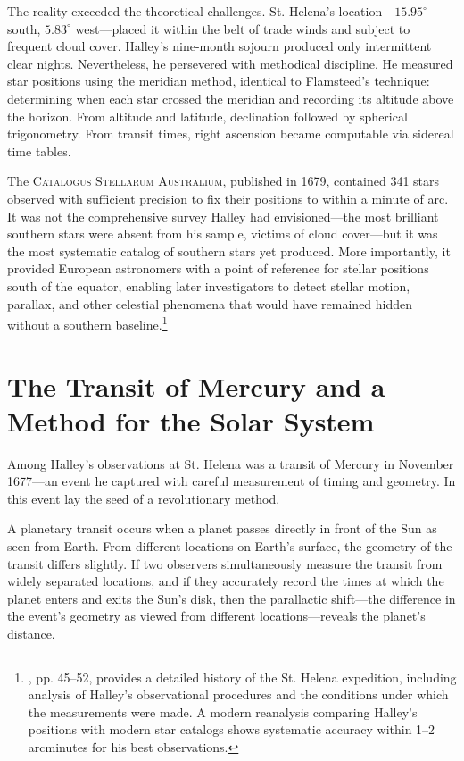 The reality exceeded the theoretical challenges. St. Helena's location—$15.95^{\circ}$ south, $5.83^{\circ}$ west—placed it within the belt of trade winds and subject to frequent cloud cover. Halley's nine-month sojourn produced only intermittent clear nights. Nevertheless, he persevered with methodical discipline. He measured star positions using the meridian method, identical to Flamsteed's technique: determining when each star crossed the meridian and recording its altitude above the horizon. From altitude and latitude, declination followed by spherical trigonometry. From transit times, right ascension became computable via sidereal time tables.

The \textsc{Catalogus Stellarum Australium}, published in 1679, contained 341 stars observed with sufficient precision to fix their positions to within a minute of arc. It was not the comprehensive survey Halley had envisioned—the most brilliant southern stars were absent from his sample, victims of cloud cover—but it was the most systematic catalog of southern stars yet produced. More importantly, it provided European astronomers with a point of reference for stellar positions south of the equator, enabling later investigators to detect stellar motion, parallax, and other celestial phenomena that would have remained hidden without a southern baseline.\footnote{\textcite{Cook1998}, pp. 45--52, provides a detailed history of the St. Helena expedition, including analysis of Halley's observational procedures and the conditions under which the measurements were made. A modern reanalysis comparing Halley's positions with modern star catalogs shows systematic accuracy within 1--2 arcminutes for his best observations.}

\section{The Transit of Mercury and a Method for the Solar System}

Among Halley's observations at St. Helena was a transit of Mercury in November 1677---an event he captured with careful measurement of timing and geometry. In this event lay the seed of a revolutionary method.

A planetary transit occurs when a planet passes directly in front of the Sun as seen from Earth. From different locations on Earth's surface, the geometry of the transit differs slightly. If two observers simultaneously measure the transit from widely separated locations, and if they accurately record the times at which the planet enters and exits the Sun's disk, then the parallactic shift—the difference in the event's geometry as viewed from different locations—reveals the planet's distance.

